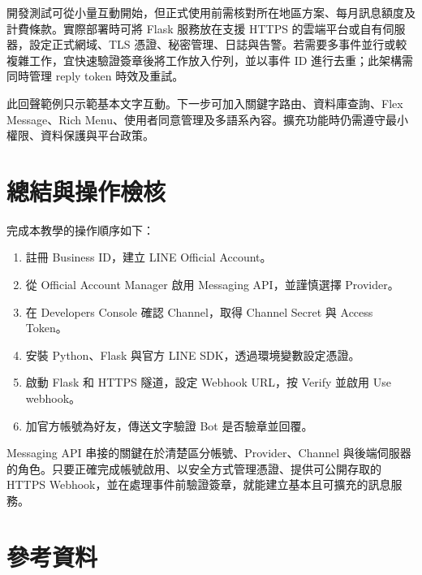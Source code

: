 \documentclass[a4paper,12pt]{report}
\begin{document}
開發測試可從小量互動開始，但正式使用前需核對所在地區方案、每月訊息額度及計費條款。實際部署時可將 Flask 服務放在支援 HTTPS 的雲端平台或自有伺服器，設定正式網域、TLS 憑證、秘密管理、日誌與告警。若需要多事件並行或較複雜工作，宜快速驗證簽章後將工作放入佇列，並以事件 ID 進行去重；此架構需同時管理 reply token 時效及重試。

此回聲範例只示範基本文字互動。下一步可加入關鍵字路由、資料庫查詢、Flex Message、Rich Menu、使用者同意管理及多語系內容。擴充功能時仍需遵守最小權限、資料保護與平台政策。

\chapter{總結與操作檢核}

完成本教學的操作順序如下：
\begin{enumerate}
  \item 註冊 Business ID，建立 LINE Official Account。
  \item 從 Official Account Manager 啟用 Messaging API，並謹慎選擇 Provider。
  \item 在 Developers Console 確認 Channel，取得 Channel Secret 與 Access Token。
  \item 安裝 Python、Flask 與官方 LINE SDK，透過環境變數設定憑證。
  \item 啟動 Flask 和 HTTPS 隧道，設定 Webhook URL，按 Verify 並啟用 Use webhook。
  \item 加官方帳號為好友，傳送文字驗證 Bot 是否驗章並回覆。
\end{enumerate}

Messaging API 串接的關鍵在於清楚區分帳號、Provider、Channel 與後端伺服器的角色。只要正確完成帳號啟用、以安全方式管理憑證、提供可公開存取的 HTTPS Webhook，並在處理事件前驗證簽章，就能建立基本且可擴充的訊息服務。

\chapter{參考資料}
\end{document}

